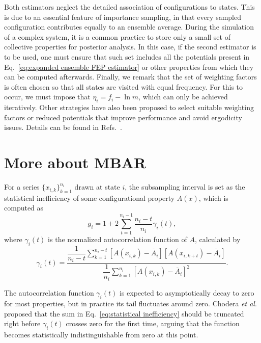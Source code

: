 \documentclass[aip,jcp,reprint,amsmath,amssymb]{revtex4-1}
\begin{document}
Both estimators neglect the detailed association of configurations to states. This is due to an essential feature of importance sampling, in that every sampled configuration contributes equally to an ensemble average. During the simulation of a complex system, it is a common practice to store only a small set of collective properties for posterior analysis. In this case, if the second estimator is to be used, one must ensure that such set includes all the potentials present in Eq.~\eqref{eq:expanded ensemble FEP estimator} or other properties from which they can be computed afterwards. Finally, we remark that the set of weighting factors is often chosen so that all states are visited with equal frequency. For this to occur, we must impose that $\eta_i = f_i - \ln m$, which can only be achieved iteratively. Other strategies have also been proposed to select suitable weighting factors or reduced potentials that improve performance and avoid ergodicity issues. Details can be found in Refs.~.

\section{More about MBAR}
\label{sec:subsampling and uncertainty in MBAR}

For a series $\{x_{i,k}\}_{k=1}^{n_i}$ drawn at state $i$, the subsampling interval is set as the statistical inefficiency of some configurational property $A(x)$, which is computed as\cite{Chodera_2007}
\begin{equation}
\label{eq:statistical inefficiency}
g_i = 1 + 2 \sum\limits_{t=1}^{n_i-1} \frac{n_i - t}{n_i} \gamma_i(t),
\end{equation}
where $\gamma_i(t)$ is the normalized autocorrelation function of $A$, calculated by
\begin{equation*}
\gamma_i(t) = \frac{\dfrac{1}{n_i - t} \sum\limits_{k=1}^{n_i-t} \left[A(x_{i,k}) - \overline A_i\right]\left[A(x_{i,k+t}) - \overline A_i\right]}{\dfrac{1}{n_i} \sum\limits_{k=1}^{n_i} \left[A(x_{i,k}) - \overline A_i\right]^2}.
\end{equation*}

The autocorrelation function $\gamma_i(t)$ is expected to asymptotically decay to zero for most properties, but in practice its tail fluctuates around zero. Chodera \textit{et al}.\cite{Chodera_2007} proposed that the sum in Eq.~\eqref{eq:statistical inefficiency} should be truncated right before $\gamma_i(t)$ crosses zero for the first time, arguing that the function becomes statistically indistinguishable from zero at this point.
\end{document}
